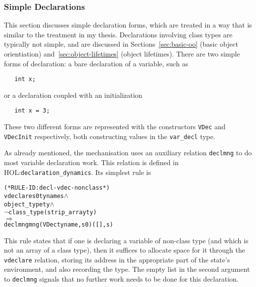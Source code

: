 \documentclass[11pt]{article}
\newcommand{\HOLfile}[1]{HOL:\texttt{#1}}
\begin{document}
\subsubsection{Simple Declarations}
\label{sec:simple-declarations}

This section discusses simple declaration forms, which are treated in
a way that is similar to the treatment in my thesis.  Declarations
involving class types are typically not simple, and are discussed in
Sections~\ref{sec:basic-oo} (basic object orientiation)
and~\ref{sec:object-lifetimes} (object lifetimes). There are two
simple forms of declaration: a bare declaration of a variable, such as
\begin{verbatim}
   int x;
\end{verbatim}
or a declaration coupled with an initialization
\begin{verbatim}
   int x = 3;
\end{verbatim}
  These
two different forms are represented with the constructors
\texttt{VDec} and \texttt{VDecInit} respectively, both constructing
values in the \texttt{var_decl} type.

%
As already mentioned, the \cpp{} mechanisation uses an auxiliary
relation \texttt{declmng} to do most variable declaration work.  This
relation is defined in \HOLfile{declaration_dynamics}.  Its simplest
rule is
\begin{center}
\begin{minipage}{\textwidth}
%
\begin{alltt}
(* RULE-ID: decl-vdec-nonclass *)
     vdeclare s0 ty name s \(\land\)
     object_type ty \(\land\)
     \(\neg\)class_type (strip_array ty)
   \(\Rightarrow\)
     declmng mng (VDec ty name, s0) ([], s)
\end{alltt}
  \end{minipage}
\end{center}
This rule states that if one is declaring a variable of non-class type
(and which is not an array of a class type), then it suffices to
allocate space for it through the \texttt{vdeclare} relation, storing
its address in the appropriate part of the state's environment, and
also recording the type.  The empty list in the second argument to
\texttt{declmng} signals that no further work needs to be done for
this declaration.
\end{document}
